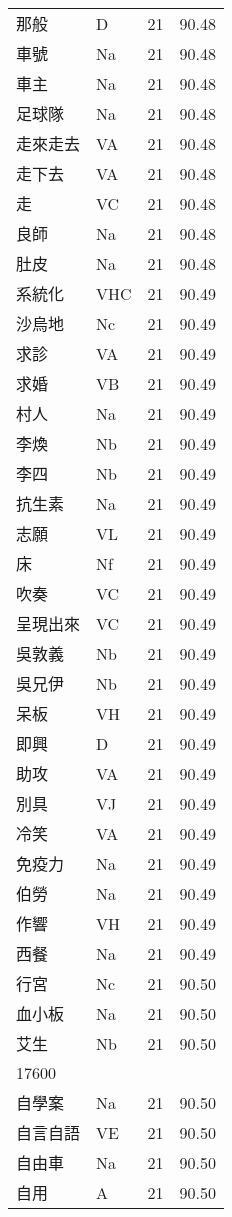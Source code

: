 \documentclass[twocolumn]{book}
\begin{document}
\begin{supertabular}{llrr}
那般 & D & 21 &  90.48\\
車號 & Na & 21 &  90.48\\
車主 & Na & 21 &  90.48\\
足球隊 & Na & 21 &  90.48\\
走來走去 & VA & 21 &  90.48\\
走下去 & VA & 21 &  90.48\\
走 & VC & 21 &  90.48\\
良師 & Na & 21 &  90.48\\
肚皮 & Na & 21 &  90.48\\
系統化 & VHC & 21 &  90.49\\
沙烏地 & Nc & 21 &  90.49\\
求診 & VA & 21 &  90.49\\
求婚 & VB & 21 &  90.49\\
村人 & Na & 21 &  90.49\\
李煥 & Nb & 21 &  90.49\\
李四 & Nb & 21 &  90.49\\
抗生素 & Na & 21 &  90.49\\
志願 & VL & 21 &  90.49\\
床 & Nf & 21 &  90.49\\
吹奏 & VC & 21 &  90.49\\
呈現出來 & VC & 21 &  90.49\\
吳敦義 & Nb & 21 &  90.49\\
吳兄伊 & Nb & 21 &  90.49\\
呆板 & VH & 21 &  90.49\\
即興 & D & 21 &  90.49\\
助攻 & VA & 21 &  90.49\\
別具 & VJ & 21 &  90.49\\
冷笑 & VA & 21 &  90.49\\
免疫力 & Na & 21 &  90.49\\
伯勞 & Na & 21 &  90.49\\
作響 & VH & 21 &  90.49\\
西餐 & Na & 21 &  90.49\\
行宮 & Nc & 21 &  90.50\\
血小板 & Na & 21 &  90.50\\
艾生 & Nb & 21 &  90.50\\
17600\\
自學案 & Na & 21 &  90.50\\
自言自語 & VE & 21 &  90.50\\
自由車 & Na & 21 &  90.50\\
自用 & A & 21 &  90.50\\

\end{supertabular}
\end{document}
